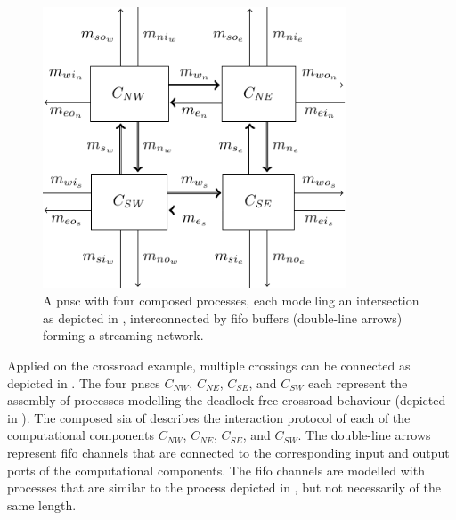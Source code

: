 \begin{figure}[bht]
    \TopFigSpace
    \centering
    \includegraphics[width=9cm]{fig/cross_procs_dl.pdf}
    \CaptionFigSpace
    \caption{A \gls{pnsc} with four composed processes, each modelling an intersection as depicted in \Fig{\ref{fig_cross_proc_sia}}, interconnected by \gls{fifo} buffers (double-line arrows) forming a streaming network.}
    \label{fig_cross_procs_dl}
    \BotFigSpace
\end{figure}
Applied on the crossroad example, multiple crossings can be connected as depicted in \Fig{\ref{fig_cross_procs_dl}}.
The four \glspl{pnsc} $C_{\mathit{NW}}$, $C_{\mathit{NE}}$, $C_{\mathit{SE}}$, and $C_{\mathit{SW}}$ each represent the assembly of processes modelling the deadlock-free crossroad behaviour (depicted in \Fig{\ref{fig_cross_proc_sia}}).
The composed \gls{sia} of \Fig{\ref{fig_cross_sia}} describes the interaction protocol of each of the computational components $C_{\mathit{NW}}$, $C_{\mathit{NE}}$, $C_{\mathit{SE}}$, and $C_{\mathit{SW}}$.
The double-line arrows represent \gls{fifo} channels that are connected to the corresponding input and output ports of the computational components.
The \gls{fifo} channels are modelled with processes that are similar to the process depicted in \Fig{\ref{fig_sia_fifo}}, but not necessarily of the same length.

